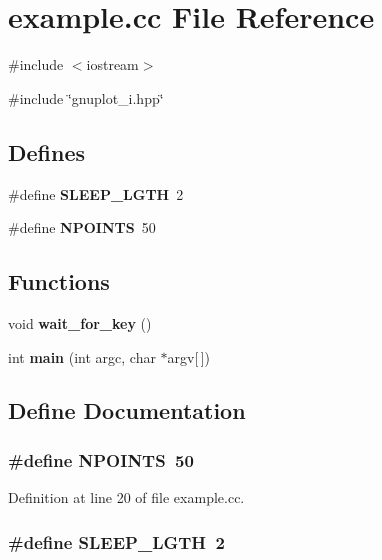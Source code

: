 \section{example.cc File Reference}
\label{d2/d80/example_8cc}
{\ttfamily \#include $<$iostream$>$}\par
{\ttfamily \#include \char`\"{}gnuplot\_\-i.hpp\char`\"{}}\par
\subsection*{Defines}
\begin{DoxyCompactItemize}
\item 
\#define {\bf SLEEP\_\-LGTH}~2
\item 
\#define {\bf NPOINTS}~50
\end{DoxyCompactItemize}
\subsection*{Functions}
\begin{DoxyCompactItemize}
\item 
void {\bf wait\_\-for\_\-key} ()
\item 
int {\bf main} (int argc, char $\ast$argv[$\,$])
\end{DoxyCompactItemize}


\subsection{Define Documentation}
\subsubsection[{NPOINTS}]{\setlength{\rightskip}{0pt plus 5cm}\#define NPOINTS~50}\label{d2/d80/example_8cc_a046c61fd31a06b2051fa0f57e626ee65}


Definition at line 20 of file example.cc.

\subsubsection[{SLEEP\_\-LGTH}]{\setlength{\rightskip}{0pt plus 5cm}\#define SLEEP\_\-LGTH~2}\label{d2/d80/example_8cc_a86c9f48acee3e4ad980ffbaacc293a1a}



